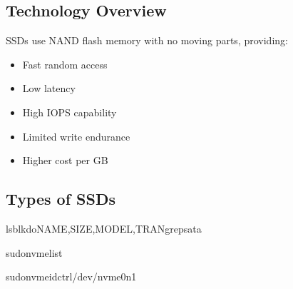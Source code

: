 \documentclass[letterpaper,10pt,english]{sphinxmanual}
\begin{document}
\subsection{Technology Overview}
\label{\detokenize{storage-devices:id1}}
\sphinxAtStartPar
SSDs use NAND flash memory with no moving parts, providing:
\begin{itemize}
\item {} 
\sphinxAtStartPar
Fast random access

\item {} 
\sphinxAtStartPar
Low latency

\item {} 
\sphinxAtStartPar
High IOPS capability

\item {} 
\sphinxAtStartPar
Limited write endurance

\item {} 
\sphinxAtStartPar
Higher cost per GB

\end{itemize}


\subsection{Types of SSDs}
\label{\detokenize{storage-devices:types-of-ssds}}
\sphinxAtStartPar
{}

\begin{sphinxVerbatim}[commandchars=\\\{\}]
lsblk\PYGZhy{}d\PYGZhy{}oNAME,SIZE,MODEL,TRANgrepsata

\end{sphinxVerbatim}

\sphinxAtStartPar
{}

\begin{sphinxVerbatim}[commandchars=\\\{\}]
sudonvmelist

sudonvmeid\PYGZhy{}ctrl/dev/nvme0n1

\end{sphinxVerbatim}
\end{document}

